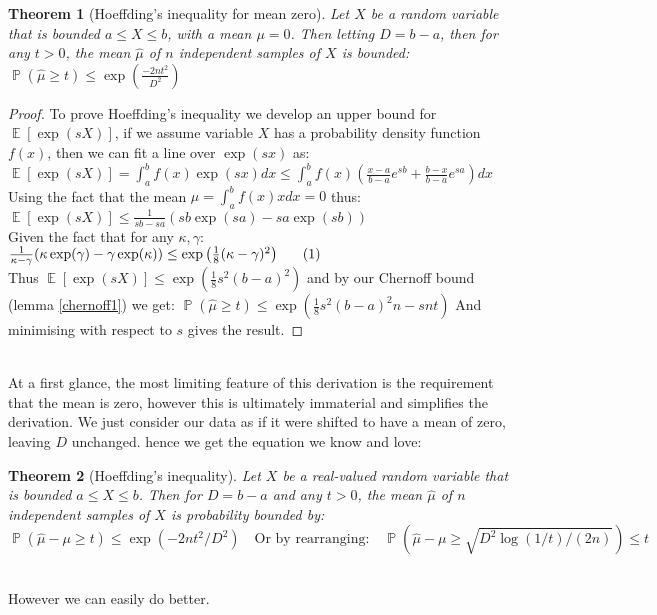 \documentclass{article}
\newtheorem{theorem}{Theorem}
\DeclareMathOperator{\E}{\mathbb{E}}
\DeclareMathOperator{\p}{\mathbb{P}}
\begin{document}
\begin{theorem}[Hoeffding's inequality for mean zero]\label{hoeffdings_inequality}
Let $X$ be a random variable that is bounded $a\le X\le b$, with a mean $\mu=0$.  Then letting $D=b-a$, then for any $t>0$, the mean $\hat{\mu}$ of $n$ independent samples of $X$ is bounded:
$\p(\hat{\mu}\ge t)\le \exp\left(\frac{-2nt^2}{D^2}\right)$
\end{theorem}
\begin{proof}
To prove Hoeffding's inequality we develop an upper bound for $\E[\exp(sX)]$, if we assume variable $X$ has a probability density function $f(x)$, then we can fit a line over $\exp(sx)$ as:
$\label{Hoeffdings_line_fitting}\E[\exp(sX)] = \int_a^bf(x)\exp(sx)dx \le \int_a^bf(x)(\frac{x-a}{b-a}e^{sb} + \frac{b-x}{b-a}e^{sa})dx$\\
Using the fact that the mean $\mu = \int_a^bf(x)xdx = 0$ thus:
$\E[\exp(sX)] \le \frac{1}{sb-sa}\left(sb\exp(sa) - sa\exp(sb) \right)$\\
Given the fact that for any $\kappa,\gamma$:
$\frac{1}{\kappa-\gamma}(\kappa\exp(\gamma)-\gamma\exp(\kappa))\le \exp\left(\frac{1}{8}(\kappa-\gamma)^2\right)~~~~~\refstepcounter{equation}(\theequation)\label{Hoeffdings_lemma} $\\
Thus $\label{hoeffdings_lemma_eq}\E[\exp(sX)] \le \exp\left(\frac{1}{8}s^2(b-a)^2 \right)$
and by our Chernoff bound (lemma \ref{chernoff1}) we get:
$ \p(\hat{\mu}\ge t) \le \exp\left(\frac{1}{8}s^2(b-a)^2 n-snt\right) $
And minimising with respect to $s$ gives the result.
\end{proof}
\-\hspace{1cm}\\
At a first glance, the most limiting feature of this derivation is the requirement that the mean is zero, however this is ultimately immaterial and simplifies the derivation. We just consider our data as if it were shifted to have a mean of zero, leaving $D$ unchanged. hence we get the equation we know and love:\\

\begin{theorem}[Hoeffding's inequality]\label{Hoeffdings_inequality_proper}
Let $X$ be a real-valued random variable that is bounded $a\le X\le b$.  Then for $D=b-a$ and any $t>0$, the mean $\hat{\mu}$ of $n$ independent samples of $X$ is probability bounded by:\\
\begin{equation}\p(\hat{\mu}-\mu\ge t)\le \exp\left(-2nt^2/D^2\right)
\quad\text{Or by rearranging:}\quad
\p\left(\hat{\mu}-\mu\ge \sqrt{D^2\log(1/t)/(2n)}\right)\le t\end{equation}
\end{theorem}
\-\hspace{1cm}\\
However we can easily do better.\\
\end{document}
